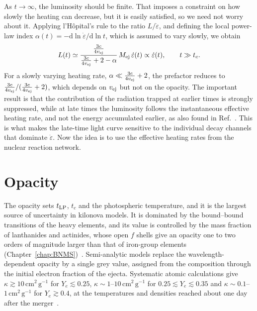 As $t\to\infty$, the luminosity should be finite.
That imposes a constraint on how slowly the heating can decrease, but it is easily satisfied, so we need not worry about it.
Applying l'H\^opital's rule to the ratio $L/\dot\varepsilon$, and defining the local power-law index $\alpha(t)=-\mathrm{d}\ln\dot\varepsilon/\mathrm{d}\ln t$, which is assumed to vary slowly, we obtain
\begin{equation}\label{eq:kn_late}
  L(t)\simeq\frac{\frac{3c}{4v_{\rm ej}}}{\frac{3c}{4v_{\rm ej}}+2-\alpha}\,M_{\rm ej}\,\dot\varepsilon(t)\propto\dot\varepsilon(t),\qquad t\gg t_c .
\end{equation}
For a slowly varying heating rate, $\alpha\ll \frac{3c}{4v_{\rm ej}}+2$, the prefactor reduces to $\frac{3c}{4v_{\rm ej}}/(\frac{3c}{4v_{\rm ej}}+2)$, which depends on $v_{\rm ej}$ but not on the opacity.
The important result is that the contribution of the radiation trapped at earlier times is strongly suppressed, while at late times the luminosity follows the instantaneous effective heating rate, and not the energy accumulated earlier, as also found in Ref.~\cite{kasen_radioactive_2019}.
This is what makes the late-time light curve sensitive to the individual decay channels that dominate $\dot\varepsilon$.
Now the idea is to use the effective heating rates from the nuclear reaction network. 

\section{Opacity}\label{sec:opacity}

The opacity sets $t_{\rm LP}$, $t_c$ and the photospheric temperature, and it is the largest source of uncertainty in kilonova models.
It is dominated by the bound--bound transitions of the heavy elements, and its value is controlled by the mass fraction of lanthanides and actinides, whose open $f$ shells give an opacity one to two orders of magnitude larger than that of iron-group elements (Chapter~\ref{chap:BNMS})~\cite{kasen_opacities_2013,tanaka_radiative_2013}.
Semi-analytic models replace the wavelength-dependent opacity by a single grey value, assigned from the composition through the initial electron fraction of the ejecta.
Systematic atomic calculations give $\kappa\gtrsim10\,\mathrm{cm^2\,g^{-1}}$ for $Y_e\lesssim0.25$, $\kappa\sim1$--$10\,\mathrm{cm^2\,g^{-1}}$ for $0.25\lesssim Y_e\lesssim0.35$ and $\kappa\sim0.1$--$1\,\mathrm{cm^2\,g^{-1}}$ for $Y_e\gtrsim0.4$, at the temperatures and densities reached about one day after the merger~\cite{tanaka_systematic_2020}.
